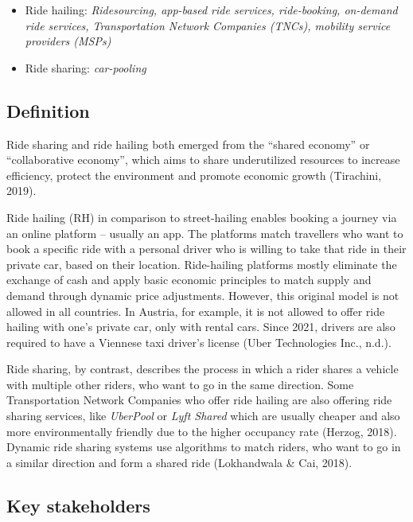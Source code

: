 \documentclass[
]{book}
\providecommand{\tightlist}{%
  \setlength{\itemsep}{0pt}\setlength{\parskip}{0pt}}
\begin{document}
\begin{itemize}
\tightlist
\item
  Ride hailing: \emph{Ridesourcing, app-based ride services, ride-booking, on-demand ride services, Transportation Network Companies (TNCs), mobility service providers (MSPs)}
\item
  Ride sharing: \emph{car-pooling}
\end{itemize}

\hypertarget{definition-34}{%
\subsection*{Definition}\label{definition-34}}

Ride sharing and ride hailing both emerged from the ``shared economy'' or ``collaborative economy'', which aims to share underutilized resources to increase efficiency, protect the environment and promote economic growth (Tirachini, 2019).

Ride hailing (RH) in comparison to street-hailing enables booking a journey via an online platform -- usually an app. The platforms match travellers who want to book a specific ride with a personal driver who is willing to take that ride in their private car, based on their location. Ride-hailing platforms mostly eliminate the exchange of cash and apply basic economic principles to match supply and demand through dynamic price adjustments. However, this original model is not allowed in all countries. In Austria, for example, it is not allowed to offer ride hailing with one's private car, only with rental cars. Since 2021, drivers are also required to have a Viennese taxi driver's license (Uber Technologies Inc., n.d.).

Ride sharing, by contrast, describes the process in which a rider shares a vehicle with multiple other riders, who want to go in the same direction. Some Transportation Network Companies who offer ride hailing are also offering ride sharing services, like \emph{UberPool} or \emph{Lyft Shared} which are usually cheaper and also more environmentally friendly due to the higher occupancy rate (Herzog, 2018). Dynamic ride sharing systems use algorithms to match riders, who want to go in a similar direction and form a shared ride (Lokhandwala \& Cai, 2018).

\hypertarget{key-stakeholders-34}{%
\subsection*{Key stakeholders}\label{key-stakeholders-34}}
\end{document}
